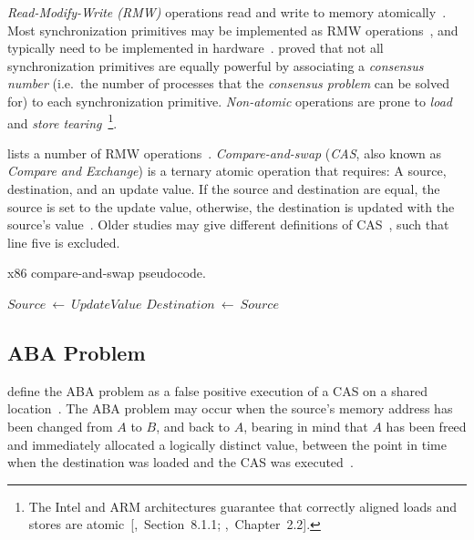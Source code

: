 \emph{Read-Modify-Write (RMW)} operations read and write to memory
atomically~\citep{perfbook2021}. Most synchronization primitives may be
implemented as RMW operations~\citep[Section~5.6]{herlihy2020art}, and
typically need to be implemented in hardware~\citep[Appendix~B.8]{herlihy2020art}.
\citeauthor{herlihy1991wait} proved that not all synchronization primitives are
equally powerful by associating a \emph{consensus number} (i.e.~the number of
processes that the \emph{consensus problem} can be solved for) to each
synchronization primitive. \emph{Non-atomic} operations are prone to \emph{load} and \emph{store
tearing}~\citep[Section~4.3.4]{perfbook2021}\footnote{The Intel and ARM
architectures guarantee that correctly aligned loads and stores are
atomic~[\citealp{intel2021system},~Section~8.1.1;
\citealp{arm2022architecture},~Chapter~2.2].}.

\citeauthor{scott2013shared} lists a number of RMW operations~\citep[Table~2.2]{scott2013shared}.
\emph{Compare-and-swap} (\emph{CAS}, also known as \emph{Compare and Exchange})
is a ternary atomic operation that requires: A source, destination, and an
update value. If the source and destination are equal, the source is set to the
update value, otherwise, the destination is updated with the source's
value~\citep{intel2021inst}.
Older studies may give different definitions of
CAS~\citetext{\citealp{scott2013shared},~Table~2.2;~\citealp{valois1995datastructures},~Appendix~A},
such that line five is excluded.

\SetNoFillComment
{}
\begin{algorithm}[hbt!]
    \caption{x86 compare-and-swap pseudocode.}\label{alg:cas}
        {
            $Source~\gets~UpdateValue$\;
            \;
        }
        $Destination~\gets~Source$\label{alg:line:sourceneqdest}\;
        \;
\end{algorithm}

\subsection{ABA Problem}
\citeauthor{dechev2010understanding} define the ABA problem as a false positive
execution of a CAS on a shared location~\citep{dechev2010understanding}. The ABA
problem may occur when the source's memory address has been changed from $A$ to
$B$, and back to $A$, bearing in mind that $A$ has been freed and immediately
allocated a logically distinct value, between the point in time when the
destination was loaded and the CAS was executed~\citep{dechev2010understanding}.

